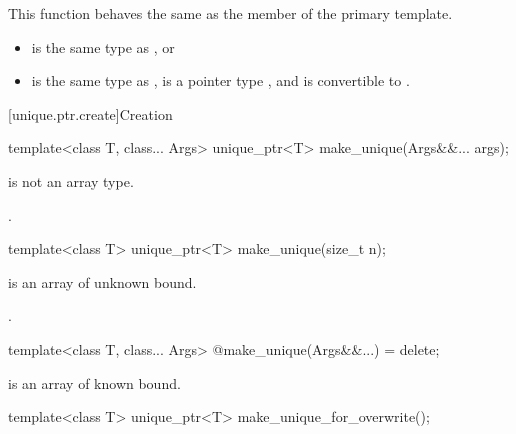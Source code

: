 \begin{itemdescr}
\pnum
This function behaves the same as
the  member of the primary template.

\pnum
\constraints
\begin{itemize}
\item {} is the same type as , or
\item {} is the same type as ,
       is a pointer type , and
       is convertible to .
\end{itemize}
\end{itemdescr}

[unique.ptr.create]{Creation}

%
\begin{itemdecl}
template<class T, class... Args> unique_ptr<T> make_unique(Args&&... args);
\end{itemdecl}

\begin{itemdescr}
\pnum
\constraints
{} is not an array type.

\pnum
\returns
{}.

\end{itemdescr}

%
\begin{itemdecl}
template<class T> unique_ptr<T> make_unique(size_t n);
\end{itemdecl}

\begin{itemdescr}
\pnum
\constraints
{} is an array of unknown bound.

\pnum
\returns
{}.

\end{itemdescr}

%
\begin{itemdecl}
template<class T, class... Args> @\unspec@ make_unique(Args&&...) = delete;
\end{itemdecl}

\begin{itemdescr}
\pnum
\constraints
{} is an array of known bound.

\end{itemdescr}

%
\begin{itemdecl}
template<class T> unique_ptr<T> make_unique_for_overwrite();
\end{itemdecl}

